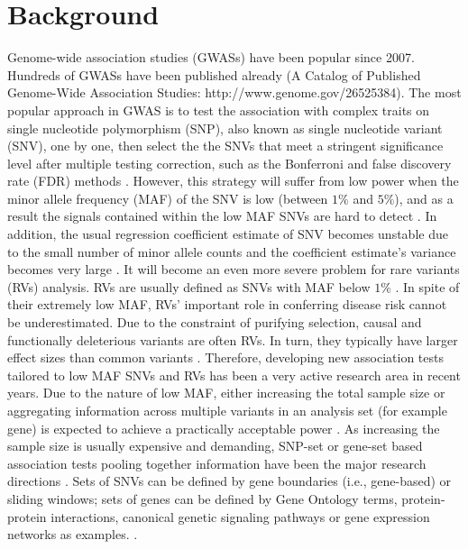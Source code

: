 \documentclass[12pt]{article}
\begin{document}
\section{Background}\label{sec:background}
\doublespacing
Genome-wide association studies (GWASs) have been popular since 2007. Hundreds of GWASs have been published already (A Catalog of Published Genome-Wide Association Studies: http://www.genome.gov/26525384). The most popular approach in GWAS is to test the association with complex traits on single nucleotide polymorphism (SNP), also known as single nucleotide variant (SNV), one by one, then select the the SNVs that meet a stringent significance level after multiple testing correction, such as the Bonferroni and false discovery rate (FDR) methods \cite{McCarthy2008,Hirschhorn2005}. However, this strategy will suffer from low power when the minor allele frequency (MAF) of the SNV is low (between $1\%$ and $5\%$), and as a result the signals contained within the low MAF SNVs are hard to detect \cite{Sham2014}. In addition, the usual regression coefficient estimate of SNV becomes unstable due to the small number of minor allele counts and the coefficient estimate's variance becomes very large \cite{Sham2014}. It will become an even more severe problem for rare variants (RVs) analysis. RVs are usually defined as SNVs with MAF below $1\%$ \cite{Bansal2010}. In spite of their extremely low MAF, RVs' important role in conferring disease risk cannot be underestimated. Due to the constraint of purifying selection, causal and functionally deleterious variants are often RVs. In turn, they typically have larger effect sizes than common variants \cite{Fu2013,Bansal2010,Sham2014,McCarthy2008}. Therefore, developing new association tests tailored to low MAF SNVs and RVs has been a very active research area in recent years. Due to the nature of low MAF, either increasing the total sample size or aggregating information across multiple variants in an analysis set (for example gene) is expected to achieve a practically acceptable power \cite{Capanu2011,Basu2011,Bansal2010,Sham2014}. As increasing the sample size is usually expensive and demanding, SNP-set or gene-set based association tests pooling together information have been the major research directions \cite{Ye2011,Pinto2010,Sham2014}. Sets of SNVs can be defined by gene boundaries (i.e., gene-based) or sliding windows; sets of genes can be defined by Gene Ontology terms, protein-protein interactions, canonical genetic signaling pathways or gene expression networks as examples. \cite{Sham2014,DelaCruz2010,Weng2011,Wang2010,Wei2012a}.
\end{document}
